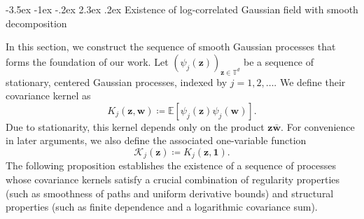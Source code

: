 \documentclass[12pt]{amsart}
\makeatletter
\theoremstyle{definition}
\theoremstyle{remark}
\newcommand{\bz}{\boldsymbol{z}}
\newcommand{\bw}{\boldsymbol{w}}
\newcommand{\E}{\mathbb{E}}
\newcommand{\T}{\mathbb{T}}
\renewcommand\section{\@startsection{section}{1}{\z@}%
	{-3.5ex \@plus -1ex \@minus -.2ex}%
	{2.3ex \@plus.2ex}%
	{\normalfont\large\bfseries}}%
\numberwithin{equation}{section}
\makeatother
\begin{document}
\section{Existence of log-correlated Gaussian field with smooth decomposition}\label{sec:smooth-decomposition}

In this section, we construct the sequence of smooth Gaussian processes that forms the foundation of our work. Let $(\psi_j(\bz))_{\bz\in \T^d}$ be a sequence of stationary, centered Gaussian processes, indexed by $j=1, 2, \ldots$. We define their covariance kernel as
\[
  K_j(\bz, \bw) \coloneq \E[\psi_j(\bz) \psi_j(\bw)].
\]
Due to stationarity, this kernel depends only on the product $\bz\bar{\bw}$. For convenience in later arguments, we also define the associated one-variable function
\[
  \mathcal{K}_j(\bz) \coloneq K_j(\bz, \boldsymbol{1}).
\]
The following proposition establishes the existence of a sequence of processes whose covariance kernels satisfy a crucial combination of regularity properties (such as smoothness of paths and uniform derivative bounds) and structural properties (such as finite dependence and a logarithmic covariance sum).
\end{document}

